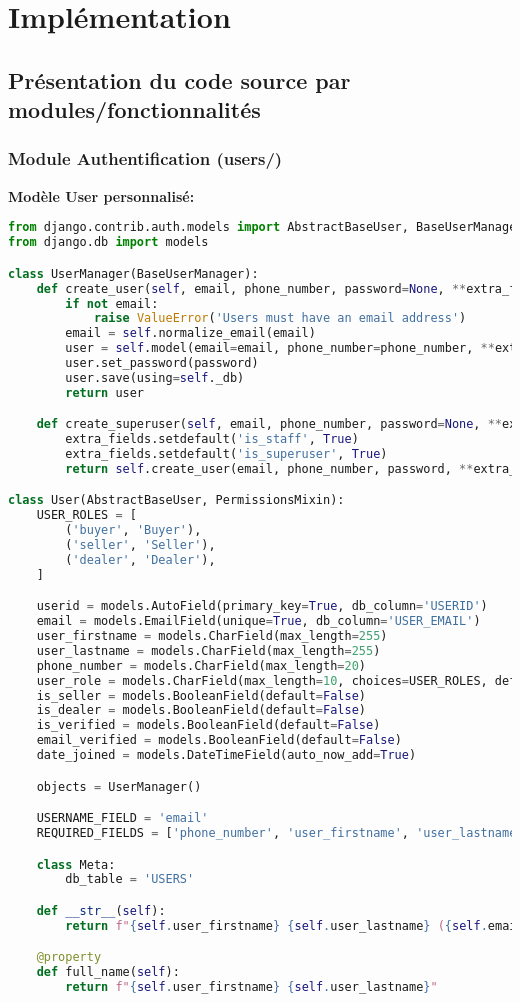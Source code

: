 \section{Implémentation}

\subsection{Présentation du code source par modules/fonctionnalités}

\subsubsection{Module Authentification (users/)}

\textbf{Modèle User personnalisé:}

\begin{lstlisting}[language=Python, caption=users/models.py - Modèle User]
from django.contrib.auth.models import AbstractBaseUser, BaseUserManager
from django.db import models

class UserManager(BaseUserManager):
    def create_user(self, email, phone_number, password=None, **extra_fields):
        if not email:
            raise ValueError('Users must have an email address')
        email = self.normalize_email(email)
        user = self.model(email=email, phone_number=phone_number, **extra_fields)
        user.set_password(password)
        user.save(using=self._db)
        return user

    def create_superuser(self, email, phone_number, password=None, **extra_fields):
        extra_fields.setdefault('is_staff', True)
        extra_fields.setdefault('is_superuser', True)
        return self.create_user(email, phone_number, password, **extra_fields)

class User(AbstractBaseUser, PermissionsMixin):
    USER_ROLES = [
        ('buyer', 'Buyer'),
        ('seller', 'Seller'),
        ('dealer', 'Dealer'),
    ]

    userid = models.AutoField(primary_key=True, db_column='USERID')
    email = models.EmailField(unique=True, db_column='USER_EMAIL')
    user_firstname = models.CharField(max_length=255)
    user_lastname = models.CharField(max_length=255)
    phone_number = models.CharField(max_length=20)
    user_role = models.CharField(max_length=10, choices=USER_ROLES, default='buyer')
    is_seller = models.BooleanField(default=False)
    is_dealer = models.BooleanField(default=False)
    is_verified = models.BooleanField(default=False)
    email_verified = models.BooleanField(default=False)
    date_joined = models.DateTimeField(auto_now_add=True)

    objects = UserManager()

    USERNAME_FIELD = 'email'
    REQUIRED_FIELDS = ['phone_number', 'user_firstname', 'user_lastname']

    class Meta:
        db_table = 'USERS'

    def __str__(self):
        return f"{self.user_firstname} {self.user_lastname} ({self.email})"

    @property
    def full_name(self):
        return f"{self.user_firstname} {self.user_lastname}"
\end{lstlisting}

